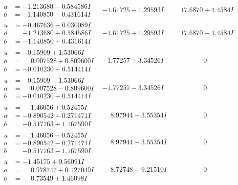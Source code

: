 \documentclass[1p]{elsarticle_modified}
\theoremstyle{definition}
\begin{document}
$$\begin{array}{c|c|c}
\begin{aligned}
a &= -1.213680 - 0.584586 I \\
b &= -1.140850 - 0.431614 I\end{aligned}
 & -1.61725 - 1.29593 I & \phantom{-}17.6870 + 1.4584 I \\ \hline\begin{aligned}
u &= -0.467636 - 0.030089 I \\
a &= -1.213680 + 0.584586 I \\
b &= -1.140850 + 0.431614 I\end{aligned}
 & -1.61725 + 1.29593 I & \phantom{-}17.6870 - 1.4584 I \\ \hline\begin{aligned}
u &= -0.15909 + 1.53066 I \\
a &= \phantom{-}0.007528 + 0.809600 I \\
b &= -0.010230 + 0.514414 I\end{aligned}
 & -1.77257 + 3.34526 I & \phantom{-0.000000 } 0 \\ \hline\begin{aligned}
u &= -0.15909 - 1.53066 I \\
a &= \phantom{-}0.007528 - 0.809600 I \\
b &= -0.010230 - 0.514414 I\end{aligned}
 & -1.77257 - 3.34526 I & \phantom{-0.000000 } 0 \\ \hline\begin{aligned}
u &= \phantom{-}1.46056 + 0.52455 I \\
a &= -0.890542 + 0.271471 I \\
b &= -0.517763 + 1.167590 I\end{aligned}
 & \phantom{-}8.97944 + 3.55354 I & \phantom{-0.000000 } 0 \\ \hline\begin{aligned}
u &= \phantom{-}1.46056 - 0.52455 I \\
a &= -0.890542 - 0.271471 I \\
b &= -0.517763 - 1.167590 I\end{aligned}
 & \phantom{-}8.97944 - 3.55354 I & \phantom{-0.000000 } 0 \\ \hline\begin{aligned}
u &= -1.45175 + 0.56091 I \\
a &= \phantom{-}0.978747 + 0.127049 I \\
b &= \phantom{-}0.73549 + 1.46098 I\end{aligned}
 & \phantom{-}8.72748 - 9.21510 I & \phantom{-0.000000 } 0 \\ \hline\begin{aligned}

\end{aligned}
\end{array}$$
\end{document}
